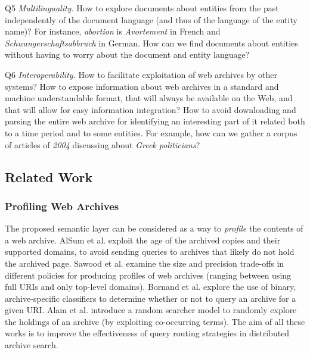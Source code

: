 \documentclass{libtex/sig-alternate-05-2015}
\begin{document}
\begin{compactitem}
\item[Q5]   {\em Multilinguality.} How to explore documents about
            entities from the past
            independently of the document language (and thus of the language
            of the entity name)? For instance,
            {\em abortion} is {\em Avortement} in French and
            {\em Sch\-wan\-ger\-schaftsabbruch} in German.
            How can we find documents about entities without having to worry
            about the document and entity language?
\item[Q6]   {\em Interoperability.}
            How to facilitate exploitation of web archives by other systems?
            How to expose information about web archives
            in a standard and machine understandable format,
            that will always be available on the Web,
            and that will allow for easy information integration?
            How to avoid downloading and parsing the entire web archive for
            identifying an interesting part of it related both to a time period
            and to some entities. For example, how can we gather a corpus
            of articles of {\em 2004} discussing about {\em Greek politicians}?
\end{compactitem}



\subsection{Related Work}
\label{rw}

\subsubsection{Profiling Web Archives}
The proposed semantic layer can be considered as a way to {\em profile}
the contents of a web archive.
AlSum et al. \cite{alsum2014profiling} exploit the age of the archived copies
and their supported domains,
to avoid sending queries to archives that likely do not hold the archived page.
Sawood et al. \cite{alam2015web} examine the size and precision
trade-offs in different policies for producing profiles of web archives
(ranging between using full URIs and only top-level domains).
Bornand et al.\cite{bornand2016routing}
explore the use of binary, archive-specific classifiers
to determine whether or not to query an archive for a given URI.
Alam et al.\cite{alam2016web}
introduce a random searcher model to randomly explore the holdings of an archive
(by exploiting co-occurring terms).
The aim of all these works is to improve the effectiveness of
query routing strategies in distributed archive search.
\end{document}
